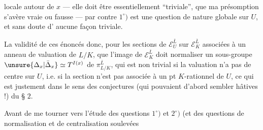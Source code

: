 locale autour de $x$ --- elle doit être essentiellement ``triviale'', que ma présomption s'avère vraie ou fausse --- par contre $1^\circ)$ est une question de nature globale sur $U$, et sans doute d' aucune façon triviale.

 La validité de ces énoncés   donc, pour les sections de $\mathcal E_U^{\bar L}$ sur $\mathcal E_K^{\bar L}$ associées à un anneau de valuation de $L/K$,  que l'image de $\mathcal E_K^{\bar L}$ doit normaliser un  sous-groupe $\unsure{\Delta_x|\bar\Delta_x}\simeq T^{I(x)}$ de $\pi_{L/K}^{\bar L}$, qui est non trivial si la valuation n'a pas de centre sur $U$, i.e. si la section n'est pas associée à un pt $K$-rationnel de $U$, ce qui est justement dans le sens des conjectures (qui pouvaient d'abord sembler hâtives !) du § $2$.

Avant de me tourner vers l'étude des questions $1^\circ)$ et $2^\circ)$ (et  des questions de normalisation et de centralisation soulevées

